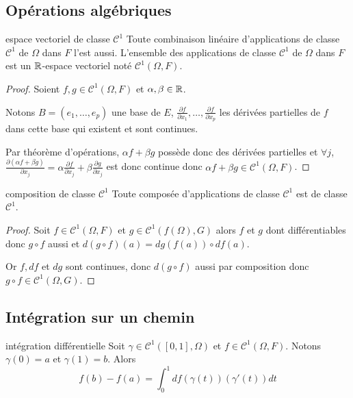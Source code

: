 \subsection{Opérations algébriques }

\begin{theoreme}{espace vectoriel de classe $\mathscr C^1$}{}
    Toute combinaison linéaire d'applications de classe $\mathscr C^1$ de $\Omega$ dans $F$
    l'est aussi. L'ensemble des applications de classe $\mathscr C^1$ de $\Omega$ dans $F$ 
    est un $\mathbb{R}$-espace vectoriel noté $\mathscr C^1(\Omega, F)$.
\end{theoreme}

\begin{proof}
    Soient $f, g \in \mathscr C^1(\Omega, F)$ et $\alpha, \beta \in \mathbb{R}$. 

    Notons $B= (e_1, \ldots, e_p)$ une base de $E$, 
    $\displaystyle \frac{\partial f}{\partial x_1}, \ldots, \frac{\partial f}{\partial x_p}$
    les dérivées partielles de $f$ dans cette base qui existent et sont continues. 

    Par théorème d'opérations, $\alpha f + \beta g$ possède donc 
    des dérivées partielles et $\forall j$, $\displaystyle \frac{\partial (\alpha f + \beta g)}{\partial x_j} = \alpha \frac{\partial f}{\partial x_j} + \beta \frac{\partial g}{\partial x_j}$
    est donc continue donc $\alpha f + \beta g \in \mathscr C^1(\Omega, F)$.
\end{proof}

\begin{proposition}{composition de classe $\mathscr C^1$}{}
    Toute composée d'applications de classe $\mathscr C^1$ est de classe $\mathscr C^1$.
\end{proposition}

\begin{proof}
    Soit $f \in \mathscr C^1(\Omega, F)$ et $g \in \mathscr C^1(f(\Omega), G)$ alors 
    $f$ et $g$ dont différentiables donc $g \circ f$ aussi et 
    $d(g \circ f)(a) = dg(f(a)) \circ df(a)$.

    Or $f, df$ et $dg$ sont continues, donc $d(g \circ f)$ aussi 
    par composition donc $g \circ f \in \mathscr C^1(\Omega, G)$.
\end{proof}


\subsection{Intégration sur un chemin}

\begin{theoreme}{intégration différentielle}{}
    Soit $\gamma \in \mathscr C^1([0, 1], \Omega)$ et $f \in \mathscr C^1(\Omega, F)$. 
    Notons $\gamma(0) = a$ et $\gamma(1) = b$. Alors 
    $$f(b) - f(a) = \int_0^1 df(\gamma(t))(\gamma'(t)) dt$$
\end{theoreme}

